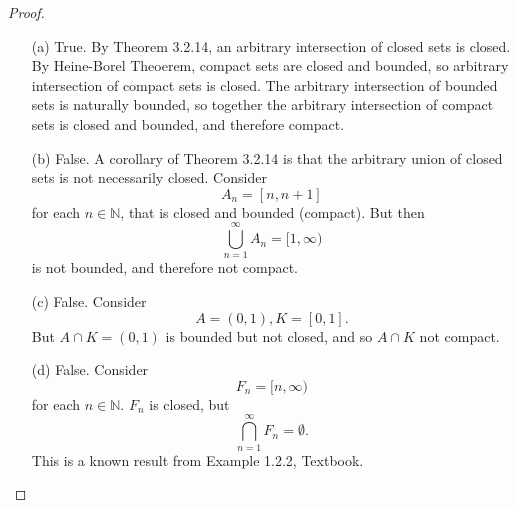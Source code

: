 \documentclass[11pt,twoside, reqno]{amsart}
\theoremstyle{remark}
\def\N{\mathbb N}
\begin{document}
\begin{proof}
\begin{enumerate}
    \item [(a)] True. By Theorem 3.2.14, an arbitrary intersection of closed sets is closed. By Heine-Borel Theoerem, compact sets are closed and bounded, so arbitrary intersection of compact sets is closed. The arbitrary intersection of bounded sets is naturally bounded, so together the arbitrary intersection of compact sets is closed and bounded, and therefore compact.
    \item [(b)] False. A corollary of Theorem 3.2.14 is that the arbitrary union of closed sets is not necessarily closed. Consider
    $$
        A_n = [n,n+1]
    $$
    for each $n \in \N$, that is closed and bounded (compact). But then
    $$
        \bigcup^\infty_{n=1} A_n = [1,\infty)
    $$
    is not bounded, and therefore not compact.
    \item [(c)] False. Consider
    $$
        A = (0,1), K = [0,1].
    $$
    But $A \cap K = (0,1)$ is bounded but not closed, and so $A \cap K$ not compact.
    \item [(d)] False. Consider
    $$
        F_n = [n,\infty)
    $$
    for each $n \in \N$. $F_n$ is closed, but
    $$
        \bigcap^\infty_{n=1} F_n = \emptyset.
    $$
    This is a known result from Example 1.2.2, Textbook.
\end{enumerate}

\end{proof}
\end{document}
